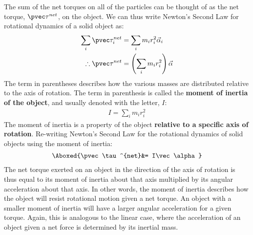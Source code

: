 The sum of the net torques on all of the particles can be thought of as the net torque, $\pvec \tau^{net}$, on the object. We can thus write Newton's Second Law for rotational dynamics of a solid object as:
\begin{align*}
\sum_i \pvec\tau_i^{net} &= \sum_i  m_ir_i^2\vec\alpha_i\\
\therefore \pvec \tau^{net}&= \left(\sum_i  m_ir_i^2\right)\vec\alpha
\end{align*}
The term in parentheses describes how the various masses are distributed relative to the axis of rotation. The term in parenthesis is called the \textbf{moment of inertia of the object}, and usually denoted with the letter, $I$:
\begin{align*}
I = \sum_i  m_ir_i^2
\end{align*}
The moment of inertia is a property of the object \textbf{relative to a specific axis of rotation}. Re-writing Newton's Second Law for the rotational dynamics of solid objects using the moment of inertia:
\begin{align}
\Aboxed{\pvec \tau^{net}&= I\vec\alpha}
\end{align}
The net torque exerted on an object in the direction of the axis of rotation is thus equal to its moment of inertia about that axis multiplied by its angular acceleration about that axis. In other words, the moment of inertia describes how the object will resist rotational motion given a net torque. An object with a smaller moment of inertia will have a larger angular acceleration for a given torque. Again, this is analogous to the linear case, where the acceleration of an object given a net force is determined by its inertial mass.
